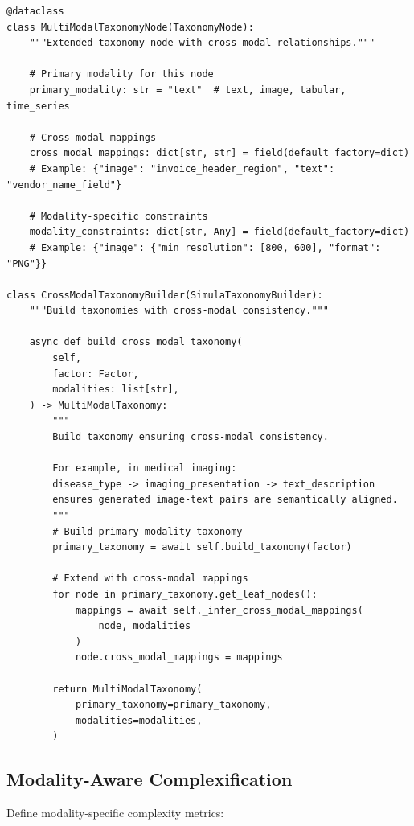 \begin{lstlisting}[language=jsonx,caption={Cross-modal taxonomy extension.}]
@dataclass
class MultiModalTaxonomyNode(TaxonomyNode):
    """Extended taxonomy node with cross-modal relationships."""
    
    # Primary modality for this node
    primary_modality: str = "text"  # text, image, tabular, time_series
    
    # Cross-modal mappings
    cross_modal_mappings: dict[str, str] = field(default_factory=dict)
    # Example: {"image": "invoice_header_region", "text": "vendor_name_field"}
    
    # Modality-specific constraints
    modality_constraints: dict[str, Any] = field(default_factory=dict)
    # Example: {"image": {"min_resolution": [800, 600], "format": "PNG"}}

class CrossModalTaxonomyBuilder(SimulaTaxonomyBuilder):
    """Build taxonomies with cross-modal consistency."""
    
    async def build_cross_modal_taxonomy(
        self,
        factor: Factor,
        modalities: list[str],
    ) -> MultiModalTaxonomy:
        """
        Build taxonomy ensuring cross-modal consistency.
        
        For example, in medical imaging:
        disease_type -> imaging_presentation -> text_description
        ensures generated image-text pairs are semantically aligned.
        """
        # Build primary modality taxonomy
        primary_taxonomy = await self.build_taxonomy(factor)
        
        # Extend with cross-modal mappings
        for node in primary_taxonomy.get_leaf_nodes():
            mappings = await self._infer_cross_modal_mappings(
                node, modalities
            )
            node.cross_modal_mappings = mappings
        
        return MultiModalTaxonomy(
            primary_taxonomy=primary_taxonomy,
            modalities=modalities,
        )
\end{lstlisting}

\subsection{Modality-Aware Complexification}

Define modality-specific complexity metrics:

